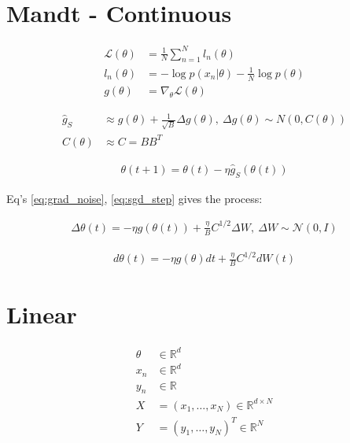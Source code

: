 \newcommand\batchSize{B}
\newcommand\sqrtC{C^{1/2}}
\newcommand\loss{\mathcal{L}}
\newcommand\lr{\eta}
\newcommand\yBar{\overline{y}}
\newcommand\yBarB{\overline{y}_{\mathcal{B}}}
\newcommand\yBarNotB{\overline{y}_{\mathcal{N} \setminus \mathcal{B}}}



\section{Mandt - Continuous}

\begin{align}
  \loss(\theta) &= \frac{1}{N} \sum_{n=1}^N l_n(\theta) \nonumber \\
  l_n(\theta) &= - \log p(x_n | \theta) - \frac{1}{N} \log p(\theta) \nonumber \\
  g(\theta) &= \nabla_{\theta} \loss(\theta)
  \label{eq:loss}
\end{align}

\begin{align}
  \hat{g}_S &\approx g(\theta) + \frac{1}{\sqrt{\batchSize}} \Delta g(\theta),\ \Delta g(\theta) \sim N(0, C(\theta)) \nonumber \\
  C(\theta) &\approx C = B B^T
  \label{eq:grad_noise}
\end{align}

\begin{align}
  \theta(t + 1) = \theta(t) - \lr \hat{g}_S( \theta(t) )
  \label{eq:sgd_step}
\end{align}

Eq's \eqref{eq:grad_noise}, \eqref{eq:sgd_step} gives the process:

\begin{align}
  \Delta \theta(t) = - \lr g( \theta(t) ) + \frac{\lr}{\batchSize} \sqrtC \Delta W,\ \Delta W \sim \mathcal{N}(0, I)
  \label{eq:sgd_step}
\end{align}

\begin{align}
  d \theta(t) = - \lr g( \theta )dt + \frac{\lr}{\batchSize} \sqrtC  dW(t)
  \label{eq:continuous:sgd_step}
\end{align}

\section{Linear}

\begin{align}
  \theta &\in \mathbb{R}^d \nonumber \\
  x_n &\in \mathbb{R}^d \nonumber \\
  y_n &\in \mathbb{R} \nonumber \\
  X &= (x_1, \dots, x_N)\in \mathbb{R}^{d \times N} \nonumber \\
  Y &= (y_1, \dots, y_N)^T \in \mathbb{R}^{N} \nonumber \\
\end{align}

